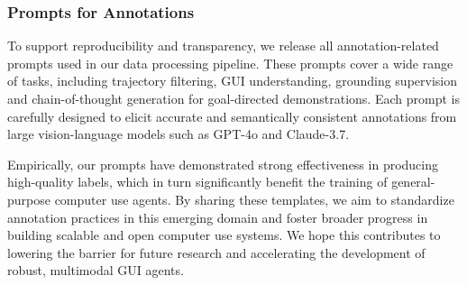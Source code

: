 \subsubsection{Prompts for Annotations}
\label{sec:prompt_template_anno}
To support reproducibility and transparency, we release all annotation-related prompts used in our data processing pipeline. These prompts cover a wide range of tasks, including trajectory filtering, GUI understanding, grounding supervision and chain-of-thought generation for goal-directed demonstrations. Each prompt is carefully designed to elicit accurate and semantically consistent annotations from large vision-language models such as GPT-4o and Claude-3.7.

Empirically, our prompts have demonstrated strong effectiveness in producing high-quality labels, which in turn significantly benefit the training of general-purpose computer use agents. By sharing these templates, we aim to standardize annotation practices in this emerging domain and foster broader progress in building scalable and open computer use systems. We hope this contributes to lowering the barrier for future research and accelerating the development of robust, multimodal GUI agents.
